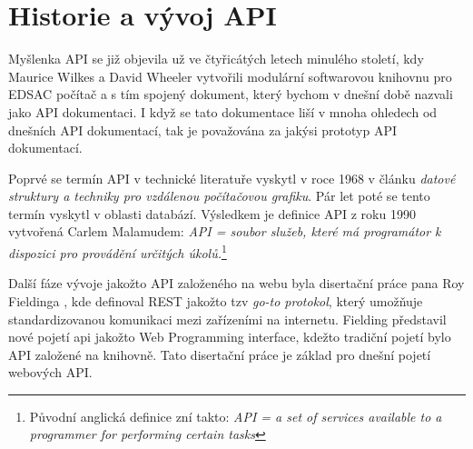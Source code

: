 \chapter{Historie a vývoj API}
\cite{apiHistory} Myšlenka API se již objevila už ve čtyřicátých letech minulého století, kdy Maurice Wilkes a David Wheeler vytvořili modulární softwarovou knihovnu pro EDSAC\cite{enwiki:1215865067} počítač
a s tím spojený dokument, který bychom v dnešní době nazvali jako API dokumentaci\cite{Wilkes1951}.
I když se tato dokumentace liší v mnoha ohledech od dnešních API dokumentací, tak je považována za jakýsi prototyp API dokumentací.

Poprvé se termín API v technické literatuře vyskytl v roce 1968 v článku \textit{datové struktury a techniky pro vzdálenou počítačovou grafiku}.\cite{art:fall_joint_computer_conference}
Pár let poté se tento termín vyskytl v oblasti databází.\cite{art:comparasion_of_the_application_programming_interfaces}
Výsledkem je definice API z roku 1990 vytvořená Carlem Malamudem: \textit{API = soubor služeb, které má programátor k dispozici pro provádění určitých úkolů.}\footnote[1]{Původní anglická definice zní takto: \textit{API = a set of services available to a programmer for performing certain tasks} }

Další fáze vývoje jakožto API založeného na webu byla disertační práce pana Roy Fieldinga\cite{phd:api_web_services}
, kde definoval REST jakožto tzv \textit{go-to protokol}, který umožňuje standardizovanou komunikaci mezi zařízeními na internetu.
Fielding představil nové pojetí api jakožto Web Programming interface, kdežto tradiční pojetí bylo API založené na knihovně. Tato disertační práce je základ pro dnešní pojetí webových API.

\endinput